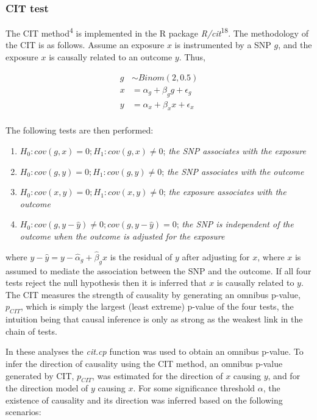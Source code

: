 \documentclass[]{article}
\providecommand{\tightlist}{%
  \setlength{\itemsep}{0pt}\setlength{\parskip}{0pt}}
\begin{document}
\subsubsection{CIT test}\label{cit-test}

The CIT method\textsuperscript{4} is implemented in the R package
\emph{R/cit}\textsuperscript{18}. The methodology of the CIT is as
follows. Assume an exposure \(x\) is instrumented by a SNP \(g\), and
the exposure \(x\) is causally related to an outcome \(y\). Thus,

\[
\begin{aligned}
g & \sim Binom(2, 0.5) \\
x & = \alpha_g + \beta_g g + \epsilon_g \\
y & = \alpha_x + \beta_x x + \epsilon_x \\
\end{aligned}
\]

The following tests are then performed:

\begin{enumerate}
\def\labelenumi{\arabic{enumi}.}
\tightlist
\item
  \(H_0: cov(g, x) = 0; H_1: cov(g, x) \neq 0\); \emph{the SNP
  associates with the exposure}
\item
  \(H_0: cov(g, y) = 0; H_1: cov(g, y) \neq 0\); \emph{the SNP
  associates with the outcome}
\item
  \(H_0: cov(x, y) = 0; H_1: cov(x, y) \neq 0\); \emph{the exposure
  associates with the outcome}
\item
  \(H_0: cov(g, y - \hat{y}) \neq 0; cov(g, y - \hat{y}) = 0\);
  \emph{the SNP is independent of the outcome when the outcome is
  adjusted for the exposure}
\end{enumerate}

where \(y - \hat{y} = y - \hat{\alpha}_g + \hat{\beta}_g x\) is the
residual of \(y\) after adjusting for \(x\), where \(x\) is assumed to
mediate the association between the SNP and the outcome. If all four
tests reject the null hypothesis then it is inferred that \(x\) is
causally related to \(y\). The CIT measures the strength of causality by
generating an omnibus p-value, \(p_{CIT}\), which is simply the largest
(least extreme) p-value of the four tests, the intuition being that
causal inference is only as strong as the weakest link in the chain of
tests.

In these analyses the \emph{cit.cp} function was used to obtain an
omnibus p-value. To infer the direction of causality using the CIT
method, an omnibus p-value generated by CIT, \(p_{CIT}\), was estimated
for the direction of \(x\) causing \(y\), and for the direction model of
\(y\) causing \(x\). For some significance threshold \(\alpha\), the
existence of causality and its direction was inferred based on the
following scenarios:
\end{document}
